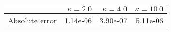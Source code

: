 \begin{tabular}{lrrr}
\toprule
 & $\kappa = 2.0$ & $\kappa = 4.0$ & $\kappa = 10.0$ \\
\midrule
Absolute error & 1.14e-06 & 3.90e-07 & 5.11e-06 \\
\bottomrule
\end{tabular}

